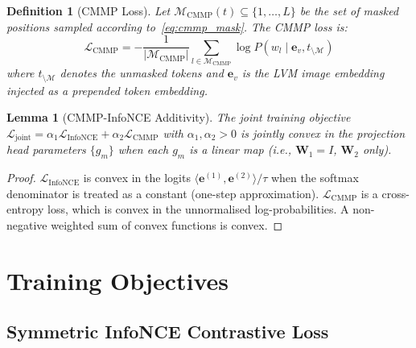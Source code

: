 \documentclass[10pt,conference]{IEEEtran}
\theoremstyle{ieeethm}
\newtheorem{lemma}[theorem]{Lemma}
\theoremstyle{ieeedef}
\newtheorem{definition}[theorem]{Definition}
\theoremstyle{ieeeremark}
\begin{document}
\begin{definition}[CMMP Loss]
\label{def:cmmp_loss}
Let $\mathcal{M}_\text{CMMP}(t) \subseteq \{1,\ldots,L\}$ be the set of masked positions sampled according to~\eqref{eq:cmmp_mask}. The CMMP loss is:
\begin{equation}
\mathcal{L}_\text{CMMP} = -\frac{1}{|\mathcal{M}_\text{CMMP}|}\sum_{l \in \mathcal{M}_\text{CMMP}} \log P(w_l \mid \mathbf{e}_v, t_{\setminus\mathcal{M}})
\label{eq:cmmp_loss}
\end{equation}
where $t_{\setminus\mathcal{M}}$ denotes the unmasked tokens and $\mathbf{e}_v$ is the LVM image embedding injected as a prepended token embedding.
\end{definition}

\begin{lemma}[CMMP-InfoNCE Additivity]
\label{lem:cmmp_infonce}
The joint training objective $\mathcal{L}_\text{joint} = \alpha_1 \mathcal{L}_\text{InfoNCE} + \alpha_2 \mathcal{L}_\text{CMMP}$ with $\alpha_1, \alpha_2 > 0$ is jointly convex in the projection head parameters $\{g_m\}$ when each $g_m$ is a linear map (i.e., $\mathbf{W}_1 = I$, $\mathbf{W}_2$ only).
\end{lemma}
\begin{proof}
$\mathcal{L}_\text{InfoNCE}$ is convex in the logits $\langle \mathbf{e}^{(1)}, \mathbf{e}^{(2)} \rangle / \tau$ when the softmax denominator is treated as a constant (one-step approximation). $\mathcal{L}_\text{CMMP}$ is a cross-entropy loss, which is convex in the unnormalised log-probabilities. A non-negative weighted sum of convex functions is convex.
\end{proof}

\section{Training Objectives}
\label{sec:loss}

\subsection{Symmetric InfoNCE Contrastive Loss}
\end{document}
